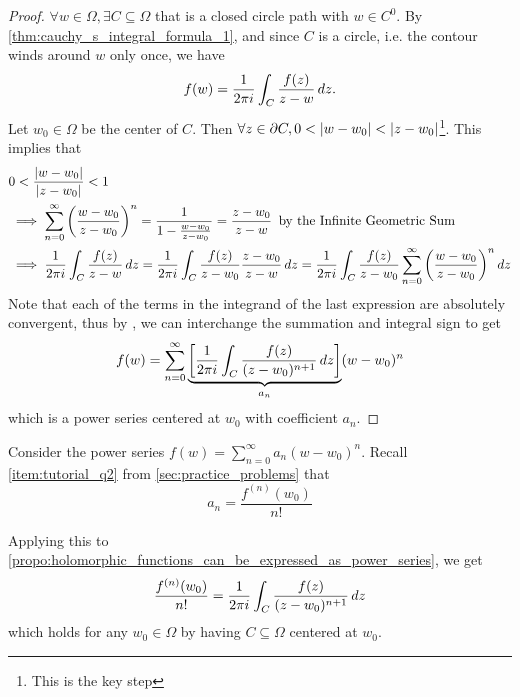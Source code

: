 \documentclass[11pt, oneside]{book}
\begin{document}
\begin{proof}
	$\forall w \in \Omega, \exists C \subseteq \Omega$ that is a closed circle path with $w \in C^0$. By \cref{thm:cauchy_s_integral_formula_1}, and since $C$ is a circle, i.e. the contour winds around $w$ only once, we have
	\begin{equation*}
		f(w) = \frac{1}{2 \pi i} \int_{C} \frac{f(z)}{z - w} \mathop{}\!d{z}.
	\end{equation*}
	Let $w_0 \in \Omega$ be the center of $C$. Then $\forall z \in \partial C, 0 < \left|w - w_0\right| < \left|z - w_0\right|$\footnote{This is the key step}. This implies that
	\begin{align*}
		&0 < \frac{\left|w - w_0\right|}{\left|z - w_0\right|} < 1 \\
		&\implies \sum_{n=0}^{\infty} \left(\frac{w - w_0}{z - w_0} \right)^n = \frac{1}{1 - \frac{w - w_0}{z - w_0}} = \frac{z - w_0}{z - w} \enspace \text{by the Infinite Geometric Sum} \\
		&\implies \frac{1}{2 \pi i} \int_{C} \frac{f(z)}{z - w} \mathop{}\!d{z} = \frac{1}{2 \pi i} \int_{C} \frac{f(z)}{z - w_0} \frac{z - w_0}{z - w} \mathop{}\!d{z} = \frac{1}{2 \pi i} \int_{C} \frac{f(z)}{z - w_0} \sum_{n=0}^{\infty} \left( \frac{w - w_0}{z - w_0} \right)^n \mathop{}\!d{z}
	\end{align*}
	Note that each of the terms in the integrand of the last expression are absolutely convergent, thus by , we can interchange the summation and integral sign to get
	\begin{equation*}
		f(w) = \sum_{n=0}^{\infty} \underbrace{\left[ \frac{1}{2 \pi i} \int_{C} \frac{f(z)}{(z - w_0)^{n + 1}} \mathop{}\!d{z} \right]}_{a_n} (w - w_0)^n
	\end{equation*}
	which is a power series centered at $w_0$ with coefficient $a_n$.
\end{proof}

\begin{note}[Recall]
	Consider the power series $f(w) = \sum_{n=0}^{\infty} a_n (w - w_0)^n$. Recall \cref{item:tutorial_q2} from \cref{sec:practice_problems} that
	\begin{equation*}
		a_n = \frac{f^{(n)}(w_0)}{n!}
	\end{equation*}

	Applying this to \cref{propo:holomorphic_functions_can_be_expressed_as_power_series}, we get
	\begin{equation*}
		\frac{f^{(n)} (w_0)}{n!} = \frac{1}{2 \pi i} \int_{C} \frac{f(z)}{(z - w_0)^{n + 1}} \mathop{}\!d{z}
	\end{equation*}
	which holds for any $w_0 \in \Omega$ by having $C \subseteq \Omega$ centered at $w_0$.
\end{note}
\end{document}
